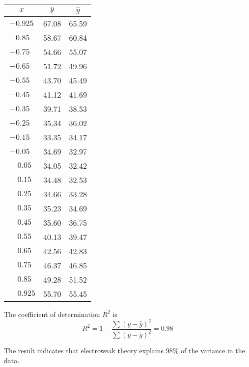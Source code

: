 \begin{center}
\begin{tabular}{|c|c|c|}
\hline
$x$ & $y$ & $\hat{y}$ \\
\hline
$-0.925$ & 67.08 & 65.59\\
$-0.85\phantom{0}$ & 58.67 & 60.84\\
$-0.75\phantom{0}$ & 54.66 & 55.07\\
$-0.65\phantom{0}$ & 51.72 & 49.96\\
$-0.55\phantom{0}$ & 43.70 & 45.49\\
$-0.45\phantom{0}$ & 41.12 & 41.69\\
$-0.35\phantom{0}$ & 39.71 & 38.53\\
$-0.25\phantom{0}$ & 35.34 & 36.02\\
$-0.15\phantom{0}$ & 33.35 & 34.17\\
$-0.05\phantom{0}$ & 34.69 & 32.97\\
$\phantom{+}0.05\phantom{0}$ & 34.05 & 32.42\\
$\phantom{+}0.15\phantom{0}$ & 34.48 & 32.53\\
$\phantom{+}0.25\phantom{0}$ & 34.66 & 33.28\\
$\phantom{+}0.35\phantom{0}$ & 35.23 & 34.69\\
$\phantom{+}0.45\phantom{0}$ & 35.60 & 36.75\\
$\phantom{+}0.55\phantom{0}$ & 40.13 & 39.47\\
$\phantom{+}0.65\phantom{0}$ & 42.56 & 42.83\\
$\phantom{+}0.75\phantom{0}$ & 46.37 & 46.85\\
$\phantom{+}0.85\phantom{0}$ & 49.28 & 51.52\\
$\phantom{+}0.925$ & 55.70 & 55.45\\
\hline
\end{tabular}
\end{center}

The coefficient of determination $R^2$ is
\begin{equation*}
R^2=1-\frac{\sum(y-\hat{y})^2}{\sum(y-\bar{y})^2}=0.98
\end{equation*}

The result indicates that electroweak theory explains 98\% of the variance in the data.


